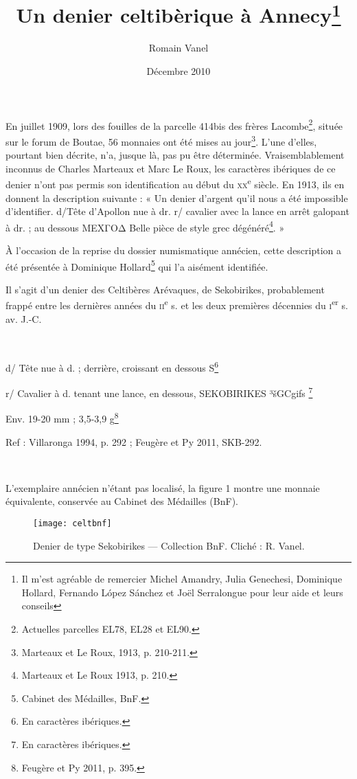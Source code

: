 \documentclass[a4paper,12pt]{article}
\title{Un denier celtibèrique à Annecy\footnote{Il m’est agréable de remercier Michel Amandry, Julia Genechesi, Dominique Hollard, Fernando López Sánchez et Joël Serralongue pour leur aide et leurs conseils}}
\date{Décembre 2010}
\author{Romain Vanel}
\begin{document}
\maketitle
\thispagestyle{fancy}




En juillet 1909, lors des fouilles de la parcelle 414bis des frères 
Lacombe\footnote{Actuelles parcelles EL78, EL28 et EL90.}, située sur le forum de
 Boutae, 56 monnaies ont été mises au jour\footnote{Marteaux et Le Roux, 1913, p. 210-211.}.
L’une d’elles, pourtant bien décrite, n’a, jusque là, pas pu être déterminée. 
Vraisemblablement inconnus de Charles Marteaux et Marc Le Roux, les caractères ibériques
 de ce denier n’ont pas permis son identification au début du \textsc{xx}\textsuperscript{e} siècle.
 En 1913, ils en donnent la description suivante : « Un denier
 d’argent qu’il nous a été impossible d’identifier. d/Tête d’Apollon nue à dr.
 r/ cavalier avec la lance en arrêt galopant à dr. ; au dessous ΜΕΧΓΟΔ Belle
 pièce de style grec dégénéré\footnote{Marteaux et Le Roux 1913, p. 210.}. »

À l’occasion de la reprise du dossier numismatique annécien, cette description
 a été présentée à Dominique Hollard\footnote{Cabinet des Médailles, BnF.} qui l’a aisément identifiée.

Il s’agit d’un denier des Celtibères Arévaques, de Sekobirikes, probablement frappé entre les dernières années du
\textsc{ii}\textsuperscript{e} s. et les deux premières décennies du \textsc{i}\textsuperscript{er} s. av. J.-C.

~

d/ Tête nue à d. ; derrière, croissant en dessous S\footnote{En caractères ibériques.}

r/ Cavalier à d. tenant une lance, en dessous, SEKOBIRIKES {\celtib ³šGCgiƒs} \footnote{En caractères ibériques.}

Env. 19-20 mm ; 3,5-3,9 g\footnote{Feugère et Py 2011, p. 395.}

Ref : Villaronga 1994, p. 292 ; Feugère et Py 2011, SKB-292.

~

L’exemplaire annécien n’étant pas localisé, la figure 1 montre une monnaie
équivalente, conservée au Cabinet des Médailles (BnF).


\begin{figure}[!h]
\texttt{[image: celtbnf]}
\centering
\caption{Denier de type Sekobirikes --- Collection BnF. Cliché : R. Vanel.}
\end{figure}
\end{document}

